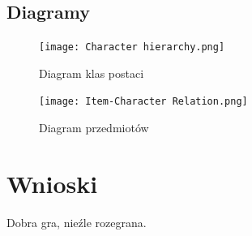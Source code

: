 \documentclass[11pt]{article}
\begin{document}

%


\subsection{Diagramy}

\begin{figure}[h!] 
\texttt{[image: Character hierarchy.png]}
\caption{Diagram klas postaci}
\end{figure}

\begin{figure}[h!] 
\texttt{[image: Item-Character Relation.png]}
\caption{Diagram przedmiotów}
\end{figure}



\section{Wnioski}

Dobra gra, nieźle rozegrana.


\begin{thebibliography}{9}

\end{thebibliography}
\end{document}
